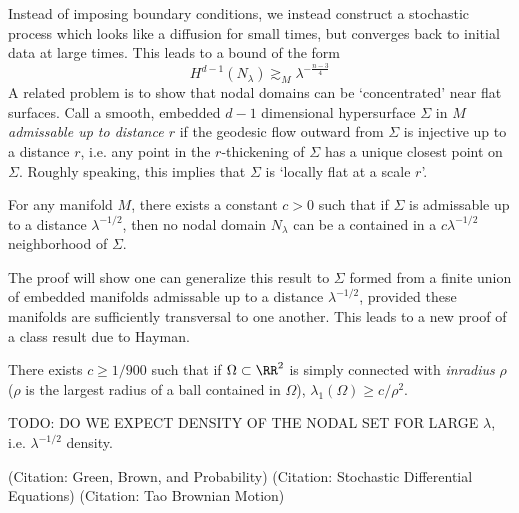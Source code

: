 Instead of imposing boundary conditions, we instead construct a stochastic process which looks like a diffusion for small times, but converges back to initial data at large times. This leads to a bound of the form
%
\[ H^{d-1}(N_\lambda) \gtrsim_M \lambda^{- \frac{n-3}{4}} \]
%
A related problem is to show that nodal domains can be `concentrated' near flat surfaces. Call a smooth, embedded $d-1$ dimensional hypersurface $\Sigma$ in $M$ \emph{admissable up to distance $r$} if the geodesic flow outward from $\Sigma$ is injective up to a distance $r$, i.e. any point in the $r$-thickening of $\Sigma$ has a unique closest point on $\Sigma$. Roughly speaking, this implies that $\Sigma$ is `locally flat at a scale $r$'.

\begin{theorem}
    For any manifold $M$, there exists a constant $c > 0$ such that if $\Sigma$ is admissable up to a distance $\lambda^{-1/2}$, then no nodal domain $N_\lambda$ can be a contained in a $c \lambda^{-1/2}$ neighborhood of $\Sigma$.
\end{theorem}

The proof will show one can generalize this result to $\Sigma$ formed from a finite union of embedded manifolds admissable up to a distance $\lambda^{-1/2}$, provided these manifolds are sufficiently transversal to one another. This leads to a new proof of a class result due to Hayman.

\begin{corollary}
    There exists $c \geq 1/900$ such that if $\Omega \subset \RR^2$ is simply connected with \emph{inradius} $\rho$ ($\rho$ is the largest radius of a ball contained in $\Omega$), $\lambda_1(\Omega) \geq c/\rho^2$.
\end{corollary}

TODO: DO WE EXPECT DENSITY OF THE NODAL SET FOR LARGE $\lambda$, i.e. $\lambda^{-1/2}$ density.

(Citation: Green, Brown, and Probability)
(Citation: Stochastic Differential Equations)
(Citation: Tao Brownian Motion)


